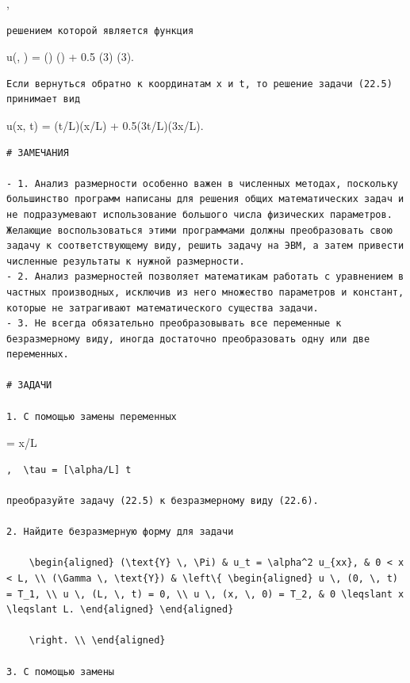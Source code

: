 \documentclass[
  ukrainian,
]{article}
\begin{document}
 \leqslant \xi {},

\begin{verbatim}
решением которой является функция
\end{verbatim}

u(\xi, \tau) = \cos(\pi \tau) \sin(\pi \xi) + 0.5 \cos(3\pi \tau)
\sin(3\pi \xi).

\begin{verbatim}
Если вернуться обратно к координатам x и t, то решение задачи (22.5) принимает вид
\end{verbatim}

u(x, t) = \cos(\pi \alpha t/L)\sin(\pi x/L) +
0.5\cos(3\pi \alpha t/L)\sin(3\pi x/L).

\begin{verbatim}
# ЗАМЕЧАНИЯ

- 1. Анализ размерности особенно важен в численных методах, поскольку большинство программ написаны для решения общих математических задач и не подразумевают использование большого числа физических параметров. Желающие воспользоваться этими программами должны преобразовать свою задачу к соответствующему виду, решить задачу на ЭВМ, а затем привести численные результаты к нужной размерности.
- 2. Анализ размерностей позволяет математикам работать с уравнением в частных производных, исключив из него множество параметров и констант, которые не затрагивают математического существа задачи.
- 3. Не всегда обязательно преобразовывать все переменные к безразмерному виду, иногда достаточно преобразовать одну или две переменных.

# ЗАДАЧИ

1. С помощью замены переменных
\end{verbatim}

\xi = x/L

\begin{verbatim}
,  \tau = [\alpha/L] t 

преобразуйте задачу (22.5) к безразмерному виду (22.6).

2. Найдите безразмерную форму для задачи

    \begin{aligned} (\text{Y} \, \Pi) & u_t = \alpha^2 u_{xx}, & 0 < x < L, \\ (\Gamma \, \text{Y}) & \left\{ \begin{aligned} u \, (0, \, t) = T_1, \\ u \, (L, \, t) = 0, \\ u \, (x, \, 0) = T_2, & 0 \leqslant x \leqslant L. \end{aligned} \end{aligned}

    \right. \\ \end{aligned}

3. С помощью замены
\end{verbatim}
\end{document}

